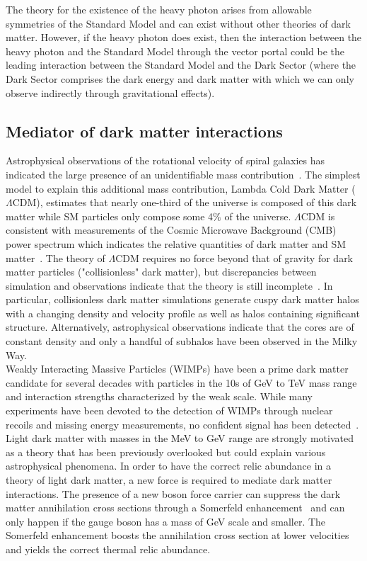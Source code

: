 The theory for the existence of the heavy photon arises from allowable symmetries of the Standard Model and can exist without other theories of dark matter. However, if the heavy photon does exist, then the interaction between the heavy photon and the Standard Model through the vector portal could be  the leading interaction between the Standard Model and the Dark Sector (where the Dark Sector comprises the dark energy and dark matter with which we can only observe indirectly through gravitational effects).

\subsection{Mediator of dark matter interactions}

Astrophysical observations of the rotational velocity of spiral galaxies has indicated the large presence of an unidentifiable mass contribution~\cite{Sofue:2000jx}. The simplest model to explain this additional mass contribution, Lambda Cold Dark Matter ($\Lambda$CDM), estimates that nearly one-third of the universe is composed of this dark matter while SM particles only compose some 4$\%$ of the universe. $\Lambda$CDM is consistent with measurements of the Cosmic Microwave Background (CMB) power spectrum which indicates the relative quantities of dark matter and SM matter~\cite{madhavacheril_current_2014}. The theory of $\Lambda$CDM requires no force beyond that of gravity for dark matter particles ("collisionless" dark matter), but discrepancies between simulation and observations indicate that the theory is still incomplete~\cite{weinberg_cold_2013}. In particular, collisionless dark matter simulations generate cuspy dark matter halos with a changing density and velocity profile as well as halos containing significant structure. Alternatively, astrophysical observations indicate that the cores are of constant density and only a handful of subhalos have been observed in the Milky Way.  \\
\indent Weakly Interacting Massive Particles (WIMPs) have been a prime dark matter candidate for several decades with particles in the 10s of GeV to TeV mass range and interaction strengths characterized by the weak scale. While many experiments have been devoted to the detection of WIMPs through nuclear recoils and missing energy measurements, no confident signal has been detected~\cite{liu_signals_2015}. Light dark matter with masses in the MeV to GeV range are strongly motivated as a theory that has been previously overlooked but could explain various astrophysical phenomena. In order to have the correct relic abundance in a theory of light dark matter, a new force is required to mediate dark matter interactions. The presence of a new boson force carrier can suppress the dark matter annihilation cross sections through a Somerfeld enhancement~\cite{arkani-hamed_theory_2009} and can only happen if the gauge boson has a mass of GeV scale and smaller. The Somerfeld enhancement boosts the annihilation cross section at lower velocities and yields the correct thermal relic abundance. \\

